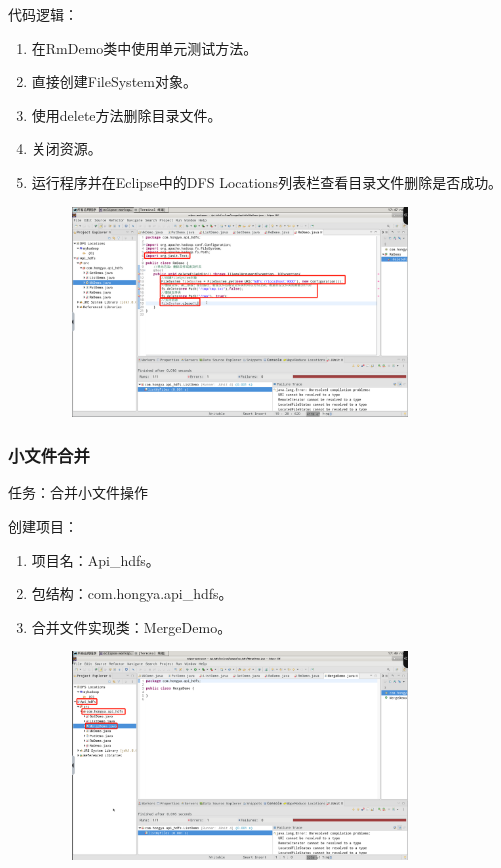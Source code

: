 \documentclass {article}
\begin{document}
				代码逻辑：
				\begin{enumerate}
					\item 在RmDemo类中使用单元测试方法。
					\item 直接创建FileSystem对象。
					\item 使用delete方法删除目录文件。
					\item 关闭资源。
					\item 运行程序并在Eclipse中的DFS Locations列表栏查看目录文件删除是否成功。
					\begin{figure}[H]
						\centering
						\includegraphics[width=3.5in]{figures/fig25.png}
					\end{figure}
				\end{enumerate}
			
			\subsubsection{小文件合并}
				任务：合并小文件操作
				
				创建项目：
				\begin{enumerate}
					\item 项目名：Api\_hdfs。
					\item 包结构：com.hongya.api\_hdfs。
					\item 合并文件实现类：MergeDemo。
					\begin{figure}[H]
						\centering
						\includegraphics[width=3.5in]{figures/fig26.png}
					\end{figure}
				\end{enumerate}
			
\end{document}
